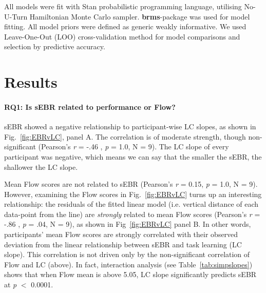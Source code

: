 \documentclass[10pt,letterpaper,floatsintext]{article}
\begin{document}
All models were fit with Stan probabilistic programming language, utilising No-U-Turn Hamiltonian Monte Carlo sampler. {\bf brms}-package was used for model fitting. All model priors were defined as generic weakly informative. We used Leave-One-Out (LOO) cross-validation method for model comparisons and selection by predictive accuracy.


\section{Results}

\paragraph{RQ1: Is sEBR related to performance or Flow?}

sEBR showed a negative relationship to participant-wise LC slopes, as shown in Fig.~\ref{fig:EBRvLC}, panel A. The correlation is of moderate strength, though non-significant (Pearson's {\it r} = -.46 , {\it p} = 1.0, N = 9). %
The LC slope of every participant was negative, which means we can say that the smaller the sEBR, the shallower the LC slope.%

Mean Flow scores are not related to sEBR (Pearson's {\it r} = 0.15, {\it p} = 1.0, N = 9). %
However, examining the Flow scores in Fig.~\ref{fig:EBRvLC} turns up an interesting relationship: the residuals of the fitted linear model (i.e. vertical distance of each data-point from the line) are {\it strongly} related to mean Flow scores (Pearson's {\it r} = -.86 , {\it p} = .04, N = 9), as shown in Fig~\ref{fig:EBRvLC} panel B. %
In other words, participants' mean Flow scores are strongly correlated with their observed deviation from the linear relationship between sEBR and task learning (LC slope). This correlation is not driven only by the non-significant correlation of Flow and LC (above). In fact, interaction analysis (see Table~\ref{tab:simpslopes}) shows that when Flow mean is above 5.05, LC slope significantly predicts sEBR at {\it p} $<$ 0.0001.
\end{document}
